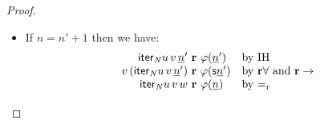 \documentclass[10pt,a4paper]{amsart}
\theoremstyle{plain}
\theoremstyle{definition}
\renewcommand{\phi}{\varphi}
\theoremstyle{plain}
\theoremstyle{definition} %
\renewcommand{\succ}{\mathsf s}
\newcommand{\numeral}[1]{\underline{#1}}
\newcommand{\nat}{\mathit{N}}
\newcommand{\N}{\nat} %
\newcommand{\iter}[1]{\mathsf{iter}_{#1}}
\newcommand{\Niter}{\iter \N}
\newcommand{\reduction}{\mathrm{r}}
\newcommand{\converts}{=_{\reduction}}
\newcommand{\limp}{\to}
\newcommand{\realises}{\mathbf{r}}
\begin{document}
\begin{proof}
\begin{itemize}
\begin{itemize}
            \item If $n = n'+1$ then we have:
            \[
            \begin{array}[b]{r@{\ \realises\ }ll}
                 \Niter u\, v\, \numeral n' & \phi(\numeral n') & \text{by IH} \\
                 v\, (\Niter u\, v\, \numeral n') & \phi(\succ{\numeral n'}) & \text{by $\realises\forall$ and $\realises\limp$} \\
                 \Niter u\, v\, w & \phi(\numeral n) & \text{by $\converts$} \tag*{\qed}
            \end{array}
            \]
        \end{itemize}
    \end{itemize}
    \renewcommand{\qed}{}
\end{proof}
\end{document}
